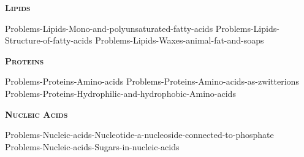 \documentclass[main.tex]{subfiles}
\begin{document}
\begin{multicols*}{2}
{\raggedright\textsc{\textbf{Lipids}}\par}


 {Problems-Lipids-Mono-and-polyunsaturated-fatty-acids}
 {Problems-Lipids-Structure-of-fatty-acids}
 {Problems-Lipids-Waxes-animal-fat-and-soaps}


 





{\raggedright\textsc{\textbf{Proteins}}\par}




  {Problems-Proteins-Amino-acids}
 {Problems-Proteins-Amino-acids-as-zwitterions}
 {Problems-Proteins-Hydrophilic-and-hydrophobic-Amino-acids}





 

 

{\raggedright\textsc{\textbf{Nucleic Acids}}\par}


 {Problems-Nucleic-acids-Nucleotide-a-nucleoside-connected-to-phosphate}
 {Problems-Nucleic-acids-Sugars-in-nucleic-acids}
 
 


\end{multicols*} \iftoggle{showfinalanswers}{
\newpage\fancyhfoffset[E,O]{0pt}
\begin{answerbox}
\begin{answersenvironment}
 \begin{localsize}{10}
{ \checkoddpage\ifoddpage    \else   \clearpage\thispagestyle{empty}\mbox{}\clearpage\fi
\Large \bf Answers}
\SetupExSheets{ headings = inline-nr , counter-format = qu) ,}
\providetoggle{printOddAnswers}\settoggle{printOddAnswers}{\printOddAnswers}\iftoggle{printOddAnswers}{\printsolutions[section] }{\printsolutions}
  \vspace{20cm}
\newpage
The end
 \end{localsize}
 \end{answersenvironment}
\end{answerbox}
}{}
\checkoddpage\ifoddpage   \clearpage\thispagestyle{empty}\mbox{}\clearpage \else   \fi
\end{document}
